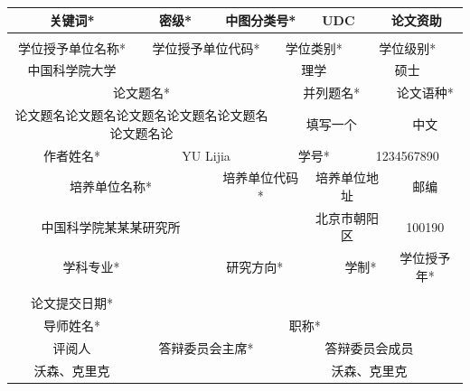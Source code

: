 \documentclass[a4paper,12pt,oneside,openany]{book}
\newcommand{\WU}{\fontsize{10.54}{12.65}\selectfont}%
\begin{document}
\begin{table}[tbph]
\addtolength{\tabcolsep}{-2.7pt}\WU

\centering{}%
\begin{tabular}{|ccccccccccc|c|ccc|cc|c||c|c||c||c||c|c|cccc|cc|c|ccccc|cc|c|cccc|cc|ccc|c|ccc|cccc|cccc|}
\hline 
\multicolumn{12}{|c|}{关键词{*}} & \multicolumn{12}{c|}{密级{*}} & \multicolumn{12}{c|}{中图分类号{*}} & \multicolumn{12}{c|}{UDC} & \multicolumn{12}{c|}{论文资助}\tabularnewline
\hline 
\multicolumn{12}{|c|}{} & \multicolumn{12}{c|}{} & \multicolumn{12}{c|}{} & \multicolumn{12}{c|}{} & \multicolumn{12}{c|}{}\tabularnewline
\hline 
\multicolumn{15}{|c|}{学位授予单位名称{*}} & \multicolumn{15}{c|}{学位授予单位代码{*}} & \multicolumn{15}{c|}{学位类别{*}} & \multicolumn{15}{c|}{学位级别{*}}\tabularnewline
\hline 
\multicolumn{15}{|c|}{中国科学院大学 } & \multicolumn{15}{c|}{} & \multicolumn{15}{c|}{理学 } & \multicolumn{15}{c|}{硕士 }\tabularnewline
\hline 
\multicolumn{30}{|c|}{论文题名{*}} & \multicolumn{22}{c|}{并列题名{*}} & \multicolumn{8}{c|}{论文语种{*}}\tabularnewline
\hline 
\multicolumn{30}{|c|}{{\scriptsize 论文题名论文题名论文题名论文题名论文题名论文题名论}} & \multicolumn{22}{c|}{{\footnotesize 填写一个}} & \multicolumn{8}{c|}{中文 }\tabularnewline
\hline 
\multicolumn{15}{|c|}{作者姓名{*}} & \multicolumn{15}{c|}{YU Lijia} & \multicolumn{15}{c|}{学号{*}} & \multicolumn{15}{c|}{1234567890}\tabularnewline
\hline 
\multicolumn{24}{|c|}{培养单位名称{*} } & \multicolumn{12}{c|}{培养单位代码{*}} & \multicolumn{20}{c|}{培养单位地址} & \multicolumn{4}{c|}{邮编}\tabularnewline
\hline 
\multicolumn{24}{|c|}{{\footnotesize 中国科学院某某某研究所}} & \multicolumn{12}{c|}{} & \multicolumn{20}{c|}{{\scriptsize 北京市朝阳区}} & \multicolumn{4}{c|}{{\scriptsize 100190}}\tabularnewline
\hline 
\multicolumn{23}{|c|}{学科专业{*}} & \multicolumn{20}{c|}{研究方向{*}} & \multicolumn{6}{c|}{学制{*}} & \multicolumn{11}{c|}{学位授予年{*} }\tabularnewline
\hline 
\multicolumn{23}{|c|}{} & \multicolumn{20}{c|}{} & \multicolumn{6}{c|}{} & \multicolumn{11}{c|}{}\tabularnewline
\hline 
\multicolumn{15}{|c|}{论文提交日期{*}} & \multicolumn{45}{c|}{}\tabularnewline
\hline 
\multicolumn{11}{|c|}{导师姓名{*}} & \multicolumn{20}{c|}{} & \multicolumn{8}{c|}{职称{*}} & \multicolumn{21}{c|}{}\tabularnewline
\hline 
\multicolumn{17}{|c|}{评阅人} & \multicolumn{11}{c|}{{\footnotesize 答辩委员会主席{*}}} & \multicolumn{32}{c|}{答辩委员会成员}\tabularnewline
\hline 
\multicolumn{17}{|c|}{{\scriptsize 沃森、克里克}} & \multicolumn{11}{c|}{} & \multicolumn{32}{c|}{{\scriptsize 沃森、克里克}}\tabularnewline

\end{tabular}
\end{table}
\end{document}
